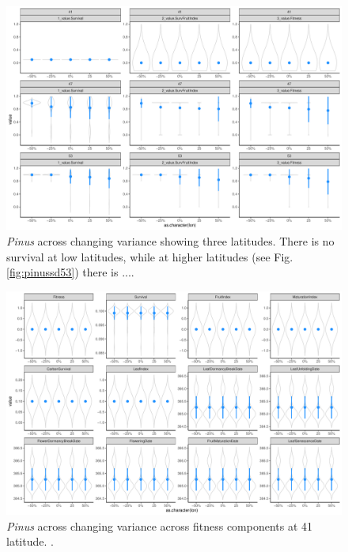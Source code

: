 \documentclass[11pt,letter]{article}
\begin{document}
\clearpage

\begin{figure} 
 \begin{center}
\noindent \includegraphics[width=1\textwidth]{..//analyses/graphs/phenofit/sims/metrics3/sdsim_3metricsPS.pdf}
  \caption{\emph{Pinus} across changing variance showing three latitudes. There is no survival at low latitudes, while at higher latitudes (see Fig. \ref{fig:pinussd53}) there is ....}
  \label{fig:pinussd3}
  \end{center}
\end{figure}

\begin{figure} 
 \begin{center}
\noindent \includegraphics[width=1\textwidth]{..//analyses/graphs/phenofit/sims/sdsim41_allmetricsPS.pdf}
  \caption{\emph{Pinus} across changing variance across fitness components at 41 latitude. .}
  \label{fig:pinussd41}
  \end{center}
\end{figure}
\end{document}
